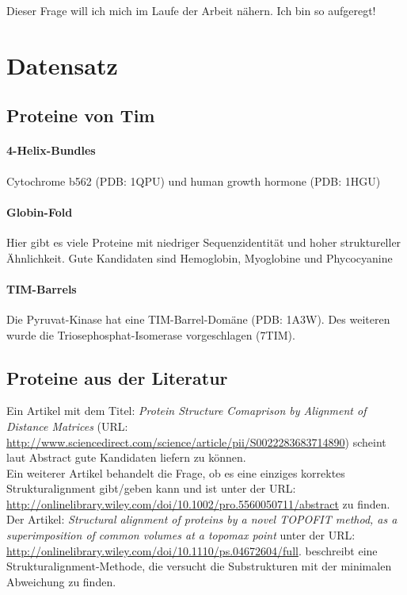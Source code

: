 \documentclass{article}
\begin{document}
Dieser Frage will ich mich im Laufe der Arbeit n\"ahern. Ich bin so aufgeregt!



\section{Datensatz}

\subsection{Proteine von Tim}

\paragraph{4-Helix-Bundles}
Cytochrome b562 (PDB: 1QPU) und human growth hormone (PDB: 1HGU)

\paragraph{Globin-Fold}
Hier gibt es viele Proteine mit niedriger Sequenzidentit\"at und hoher struktureller \"Ahnlichkeit. Gute Kandidaten sind Hemoglobin, Myoglobine und Phycocyanine

\paragraph{TIM-Barrels}
Die Pyruvat-Kinase hat eine TIM-Barrel-Dom\"ane (PDB: 1A3W). Des weiteren wurde die Triosephosphat-Isomerase vorgeschlagen (7TIM).

\subsection{Proteine aus der Literatur}


Ein Artikel mit dem Titel: \textit{Protein Structure Comaprison by Alignment of Distance Matrices} (URL: \url{http://www.sciencedirect.com/science/article/pii/S0022283683714890}) scheint laut Abstract gute Kandidaten liefern zu k\"onnen. \\
Ein weiterer Artikel behandelt die Frage, ob es eine einziges korrektes Strukturalignment gibt/geben kann und ist unter der URL: \url{http://onlinelibrary.wiley.com/doi/10.1002/pro.5560050711/abstract} zu finden. \\
Der Artikel: \textit{Structural alignment of proteins by a novel TOPOFIT method, as a superimposition of common volumes at a topomax point} unter der URL: \url{http://onlinelibrary.wiley.com/doi/10.1110/ps.04672604/full}. beschreibt eine Strukturalignment-Methode, die  versucht die Substrukturen mit der minimalen Abweichung zu finden.
\end{document}
